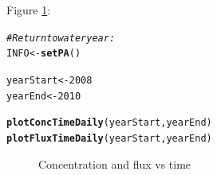 \documentclass[a4paper,11pt]{article}\usepackage[]{graphicx}\usepackage[]{color}
\makeatletter
\newcommand{\hlnum}[1]{\textcolor[rgb]{0.686,0.059,0.569}{#1}}%
\newcommand{\hlcom}[1]{\textcolor[rgb]{0.678,0.584,0.686}{\textit{#1}}}%
\newcommand{\hlstd}[1]{\textcolor[rgb]{0.345,0.345,0.345}{#1}}%
\newcommand{\hlkwb}[1]{\textcolor[rgb]{0.69,0.353,0.396}{#1}}%
\newcommand{\hlkwd}[1]{\textcolor[rgb]{0.737,0.353,0.396}{\textbf{#1}}}%
\newenvironment{kframe}{%
 \def\at@end@of@kframe{}%
 \ifinner\ifhmode%
  \def\at@end@of@kframe{\end{minipage}}%
  \begin{minipage}{\columnwidth}%
 \fi\fi%
 \def\FrameCommand##1{\hskip\@totalleftmargin \hskip-\fboxsep
 \colorbox{shadecolor}{##1}\hskip-\fboxsep
     \hskip-\linewidth \hskip-\@totalleftmargin \hskip\columnwidth}%
 \MakeFramed {\advance\hsize-\width
   \@totalleftmargin\z@ \linewidth\hsize
   \@setminipage}}%
 {\par\unskip\endMakeFramed%
 \at@end@of@kframe}
\newenvironment{knitrout}{}{} %
\makeatother
\begin{document}
Figure \ref{fig:plotConcTimeDaily}:
\begin{knitrout}
\color{fgcolor}\begin{kframe}
\begin{alltt}
\hlcom{# Return to water year:}
\hlstd{INFO} \hlkwb{<-} \hlkwd{setPA}\hlstd{()}

\hlstd{yearStart} \hlkwb{<-} \hlnum{2008}
\hlstd{yearEnd} \hlkwb{<-} \hlnum{2010}

\hlkwd{plotConcTimeDaily}\hlstd{(yearStart, yearEnd)}
\hlkwd{plotFluxTimeDaily}\hlstd{(yearStart, yearEnd)}
\end{alltt}
\end{kframe}\begin{figure}[]
\caption[Concentration and flux vs time]{Concentration and flux vs time\label{fig:plotConcTimeDaily}}
\end{figure}


\end{knitrout}
\end{document}

